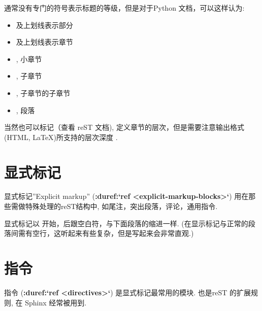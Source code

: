 \documentclass[letterpaper,10pt,english]{sphinxmanual}
\begin{document}
通常没有专门的符号表示标题的等级，但是对于Python 文档，可以这样认为:
\begin{itemize}
\item {} 
\code{\#} 及上划线表示部分

\item {} 
\code{*} 及上划线表示章节

\item {} 
\code{=}, 小章节

\item {} 
\code{-}, 子章节

\item {} 
\code{\textasciicircum{}}, 子章节的子章节

\item {} 
, 段落

\end{itemize}

当然也可以标记（查看 reST 文档), 定义章节的层次，但是需要注意输出格式(HTML, LaTeX)所支持的层次深度 .


\section{显式标记}
\label{rest:id50}
显式标记''Explicit markup'' ({\color{red}\bfseries{}:duref:{}`ref \textless{}explicit-markup-blocks\textgreater{}{}`}) 用在那些需做特殊处理的reST结构中,
如尾注，突出段落，评论，通用指令.

显式标记以  开始，后跟空白符，与下面段落的缩进一样.
(在显示标记与正常的段落间需有空行，这听起来有些复杂，但是写起来会非常直观.)


\section{指令}
\label{rest:directives}\label{rest:id53}
指令 ({\color{red}\bfseries{}:duref:{}`ref \textless{}directives\textgreater{}{}`}) 是显式标记最常用的模块.
也是reST 的扩展规则, 在 Sphinx 经常被用到.
\end{document}
